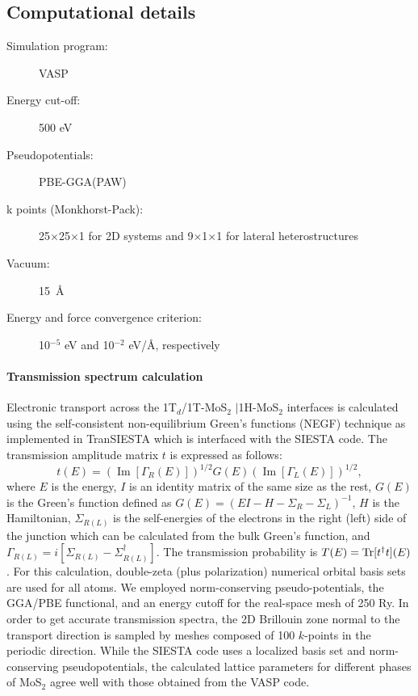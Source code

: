 \subsection{Computational details}


\begin{footnotesize}
\begin{description}
\item[Simulation program:] VASP
\item[Energy cut-off:] 500 eV
\item[Pseudopotentials:] PBE-GGA(PAW)
\item[k points (Monkhorst-Pack):] 25$\times$25$\times$1 for 2D systems and 9$\times$1$\times$1 for lateral heterostructures
\item[Vacuum:] 15~\AA
\item[Energy and force convergence criterion:] 10$^{-5}$ eV and 10$^{-2}$ eV/\AA, respectively
\end{description}
\end{footnotesize}


\paragraph{Transmission spectrum calculation} Electronic transport across the 1T$_d$/1T-MoS$_2$ $\mid$1H-MoS$_2$ interfaces is calculated using the self-consistent non-equilibrium Green's functions (NEGF) technique as implemented in TranSIESTA\cite{transiesta} which is interfaced with the SIESTA code\cite{siesta}. The transmission amplitude matrix $t$ is expressed as follows:
\begin{equation}
t(E)=(\operatorname{Im}[\Gamma_R(E)])^{1/2}G(E)(\operatorname{Im}[\Gamma_L(E)])^{1/2},
\end{equation}
where $E$ is the energy, $I$ is an identity matrix of the same size as the rest, $G(E)$ is the Green's function defined as $G(E)=(EI-H-\Sigma_R-\Sigma_L)^{-1}$, $H$ is the Hamiltonian, $\Sigma_{R(L)}$ is the self-energies of the electrons in the right (left) side of the junction which can be calculated from the bulk Green's function, and $\Gamma_{R(L)}=i[\Sigma_{R(L)}-\Sigma_{R(L)}^\dagger]$. The transmission probability is $T(E)=\operatorname{Tr}[t^\dagger t](E)$. For this calculation, double-zeta (plus polarization) numerical orbital basis sets are used for all atoms. We employed norm-conserving pseudo-potentials\cite{tm}, the GGA/PBE functional, and an energy cutoff for the real-space mesh of 250 Ry.  In order to get accurate transmission spectra, the 2D Brillouin zone normal to the transport direction is sampled by meshes composed of  100 $k$-points in the periodic direction. While the SIESTA code uses a localized basis set and norm-conserving pseudopotentials, the calculated lattice parameters for different phases of MoS$_2$ agree well with those obtained from the VASP code. 



